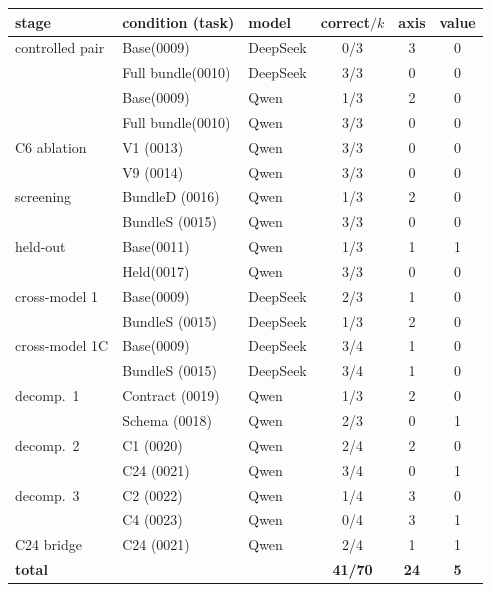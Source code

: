 \begin{tabular}{l l l c c c}
\toprule
stage & condition (task) & model & correct$/k$ & axis & value \\
\midrule
controlled pair & Base(0009) & DeepSeek & 0/3 & 3 & 0 \\
 & Full bundle(0010) & DeepSeek & 3/3 & 0 & 0 \\
 & Base(0009) & Qwen & 1/3 & 2 & 0 \\
 & Full bundle(0010) & Qwen & 3/3 & 0 & 0 \\
\midrule
C6 ablation & V1 (0013) & Qwen & 3/3 & 0 & 0 \\
 & V9 (0014) & Qwen & 3/3 & 0 & 0 \\
\midrule
screening & BundleD (0016) & Qwen & 1/3 & 2 & 0 \\
 & BundleS (0015) & Qwen & 3/3 & 0 & 0 \\
\midrule
held-out & Base(0011) & Qwen & 1/3 & 1 & 1 \\
 & Held(0017) & Qwen & 3/3 & 0 & 0 \\
\midrule
cross-model 1 & Base(0009) & DeepSeek & 2/3 & 1 & 0 \\
 & BundleS (0015) & DeepSeek & 1/3 & 2 & 0 \\
\midrule
cross-model 1C & Base(0009) & DeepSeek & 3/4 & 1 & 0 \\
 & BundleS (0015) & DeepSeek & 3/4 & 1 & 0 \\
\midrule
decomp.\ 1 & Contract (0019) & Qwen & 1/3 & 2 & 0 \\
 & Schema (0018) & Qwen & 2/3 & 0 & 1 \\
\midrule
decomp.\ 2 & C1 (0020) & Qwen & 2/4 & 2 & 0 \\
 & C24 (0021) & Qwen & 3/4 & 0 & 1 \\
\midrule
decomp.\ 3 & C2 (0022) & Qwen & 1/4 & 3 & 0 \\
 & C4 (0023) & Qwen & 0/4 & 3 & 1 \\
\midrule
C24 bridge & C24 (0021) & Qwen & 2/4 & 1 & 1 \\
\midrule
\textbf{total} & & & \textbf{41/70} & \textbf{24} & \textbf{5} \\
\bottomrule
\end{tabular}
